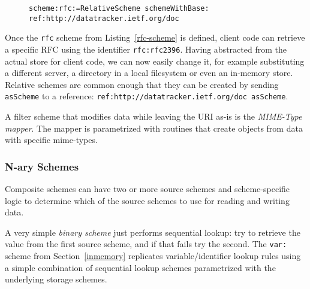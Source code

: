 \documentclass[preprint,authoryear]{llncs}
\begin{document}
\begin{figure}[htbp]
\begin{lstlisting}[style=L,label=rfc-scheme,caption=Defining a custom rfc: scheme.]
scheme:rfc:=RelativeScheme schemeWithBase: ref:http://datatracker.ietf.org/doc
\end{lstlisting}
\end{figure}

Once the {\tt rfc} scheme from Listing~\ref{rfc-scheme} is defined, client code can 
retrieve a specific RFC using the identifier {\tt  rfc:rfc2396}.  Having abstracted
from the actual store for client code, we can now easily change it, for example
substituting a different server, a directory in a local filesystem or even an 
in-memory store.  Relative schemes are common enough that they can be
created by sending {\tt asScheme} to a reference: {\tt ref:http://datatracker.ietf.org/doc asScheme}.




A filter scheme that modifies data while leaving the URI as-is is the \emph{MIME-Type mapper}.
The mapper is parametrized with routines that create objects from data with specific
mime-types.  


\subsubsection{N-ary Schemes}

Composite schemes can have two or more source schemes and scheme-specific logic
to determine which of the source schemes to use for reading and writing data.

A very simple \emph{binary scheme} just performs sequential lookup:  try to
retrieve the value from the first source scheme, and if that fails try the second.
The {\tt var:} scheme from Section~\ref{inmemory}  replicates variable/identifier
lookup rules using a simple combination of sequential lookup schemes parametrized
with the underlying storage schemes.
\end{document}
